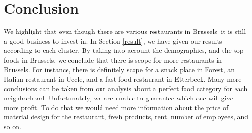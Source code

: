 \documentclass[a4paper,11pt]{amsart}
\begin{document}
\section{Conclusion}
We highlight that even though there are various restaurants in Brussels, it is still a good business to invest in. In Section \ref{result}, we have given our results according to each cluster. By taking into account the demographics, and the top foods in Brussels, we conclude that there is scope for more restaurants in Brussels. For instance, there is definitely scope for a snack place in Forest, an Italian restaurant in Uccle, and a fast food restaurant in Etterbeek. Many more conclusions can be taken from our analysis about a perfect food category for each neighborhood. Unfortunately, we are unable to guarantee which one will give more profit. To do that we would need more information about the price of material design for the restaurant, fresh products, rent, number of employees, and so on.
\end{document}

